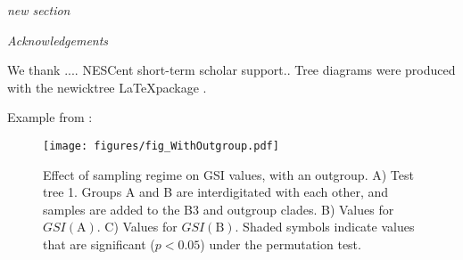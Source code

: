 \documentclass[12pt,letterpaper]{article}
\renewcommand{\section}[1]{
\bigskip
\noindent
\begin{Large}
\textit{\textsf{#1}}
\medskip
\end{Large}
}
\newcommand{\gsi}[1]{\ensuremath{GSI(\text{#1})}}
\begin{document}
\section{new section}

\section{Acknowledgements}

We thank .... NESCent short-term scholar support.. Tree diagrams were
produced with the \textsf{newicktree} \LaTeX package \citep{Savva:2004}.




\newpage

Example from \citet{Savva:2004}:
\begin{newicktree}
\end{newicktree}



\pagebreak





\pagebreak

\begin{figure} %
\texttt{[image: figures/fig\_WithOutgroup.pdf]}
\caption{Effect of sampling regime on GSI values, with an outgroup. A)
Test tree 1. Groups A and B are interdigitated with each other, and
samples are added to the B3 and outgroup clades. B) Values for \gsi{A}.
C) Values for \gsi{B}. Shaded symbols indicate values that are
significant ($p<0.05$) under the permutation test.}
\label{fig:w_outgroup}
\end{figure}
\end{document}
